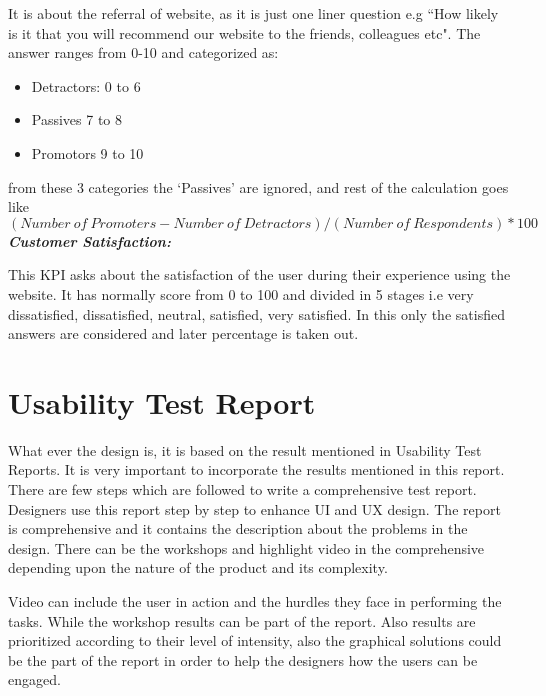 It is about the referral of website, as it is just one liner question e.g ``How likely is it that you will recommend our website to the friends, colleagues etc". The answer ranges from 0-10 and categorized as:
\begin{itemize}
\item Detractors: 0 to 6
\item Passives 7 to 8
\item Promotors 9 to 10
\end{itemize}
from these 3 categories the `Passives' are ignored, and rest of the calculation goes like \[ (Number\ of\ Promoters - Number\ of\ Detractors) / (Number\ of \ Respondents) *100\]
\textbf{\emph{Customer Satisfaction:}}\par
This KPI asks about the satisfaction of the user during their experience using the website. It has normally score from 0 to 100 and divided in 5 stages i.e very dissatisfied, dissatisfied, neutral, satisfied, very satisfied. In this only the satisfied answers are considered and later percentage is taken out.  
\section{Usability Test Report}
What ever the design is, it is based on the result mentioned in Usability Test Reports. It is very important to incorporate the results mentioned in this report. There are few steps which are followed to write a comprehensive test report. Designers use this report step by step to enhance UI and UX design. The report is comprehensive and it contains the description about the problems in the design. There can be the workshops and highlight video in the comprehensive depending upon the nature of the product and its complexity. \par
Video can include the user in action and the hurdles they face in performing the tasks. While the workshop results can be part of the report. Also results are prioritized according to their level of intensity, also the graphical solutions could be the part of the report in order to help the designers how the users can be engaged. 